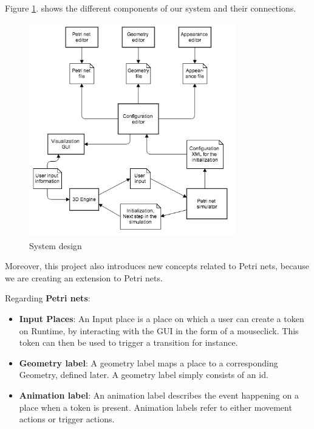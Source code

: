 Figure \ref{fig:system_diagram}. shows the different components of our system and their connections.

\begin{figure}[htp]
\begin{center}
  \includegraphics[width=0.8\textwidth]{image/system_design.png}
  \caption{System design}
  \label{fig:system_diagram}
\end{center}
\end{figure}

Moreover, this project also introduces new concepts related to Petri nets, because we are creating an extension to Petri nets.

Regarding \textbf{Petri nets}:
\begin{itemize}
  \item \textbf{Input Places}: An Input place is a place on which a user can create a token on Runtime, by interacting with the GUI in the form of a mouseclick. This token can then be used to trigger a transition for instance.
  \item \textbf{Geometry label}: A geometry label maps a place to a corresponding Geometry, defined later.
  A geometry label simply consists of an id.

  \item \textbf{Animation label}: An animation label describes the event happening on a place when a token is present.
Animation labels refer to either movement actions or trigger actions.\end{itemize}

